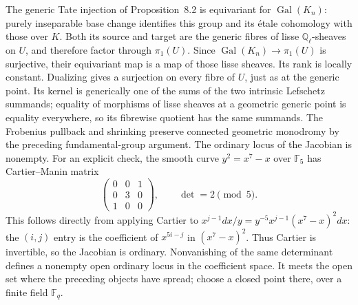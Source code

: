 The generic Tate injection of Proposition~8.2 is equivariant
for $\operatorname{Gal}(K_n)$: purely inseparable base change
identifies this group and its étale cohomology with those over
$K$.  Both its source and target are the generic fibres of
lisse $\mathbb Q_\ell$-sheaves on $U$, and therefore factor
through $\pi_1(U)$.  Since
$\operatorname{Gal}(K_n)\to\pi_1(U)$ is surjective, their
equivariant map is a map of those lisse sheaves.  Its rank is
locally constant.  Dualizing gives a surjection on every fibre
of $U$, just as at the generic point.  Its kernel is generically
one of the sums of the two intrinsic Lefschetz summands;
equality of morphisms of lisse sheaves at a geometric generic
point is equality everywhere, so its fibrewise quotient has the
same summands.  The Frobenius pullback and shrinking preserve
connected geometric monodromy by the preceding fundamental-group
argument.  The ordinary locus of the Jacobian is
nonempty.  For an explicit check, the smooth curve
$y^2=x^7-x$ over $\mathbb F_5$ has Cartier--Manin matrix
\[
 \begin{pmatrix}0&0&1\\0&3&0\\1&0&0\end{pmatrix},
 \qquad\det=2\pmod5.
\]
This follows directly from applying Cartier to
$x^{j-1}dx/y=y^{-5}x^{j-1}(x^7-x)^2dx$:
the $(i,j)$ entry is the coefficient of $x^{5i-j}$ in
$(x^7-x)^2$.  Thus Cartier is invertible, so the Jacobian is
ordinary.  Nonvanishing of the same determinant defines a
nonempty open ordinary locus in the coefficient space.  It
meets the open set where the preceding objects have spread;
choose a closed point there, over a finite field $\mathbb F_q$.


